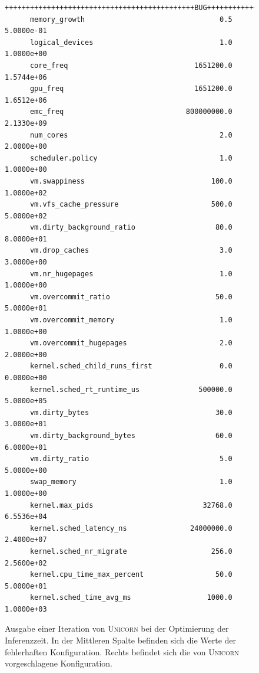 \documentclass[11pt]{article}
\begin{document}
\begin{figure}
  \centering
    \begin{Verbatim}[fontsize=\small,samepage=true]
      +++++++++++++++++++++++++++++++++++++++++++++BUG+++++++++++++++++++FIX
      memory_growth                                0.5            5.0000e-01
      logical_devices                              1.0            1.0000e+00
      core_freq                              1651200.0            1.5744e+06
      gpu_freq                               1651200.0            1.6512e+06
      emc_freq                             800000000.0            2.1330e+09
      num_cores                                    2.0            2.0000e+00
      scheduler.policy                             1.0            1.0000e+00
      vm.swappiness                              100.0            1.0000e+02
      vm.vfs_cache_pressure                      500.0            5.0000e+02
      vm.dirty_background_ratio                   80.0            8.0000e+01
      vm.drop_caches                               3.0            3.0000e+00
      vm.nr_hugepages                              1.0            1.0000e+00
      vm.overcommit_ratio                         50.0            5.0000e+01
      vm.overcommit_memory                         1.0            1.0000e+00
      vm.overcommit_hugepages                      2.0            2.0000e+00
      kernel.sched_child_runs_first                0.0            0.0000e+00
      kernel.sched_rt_runtime_us              500000.0            5.0000e+05
      vm.dirty_bytes                              30.0            3.0000e+01
      vm.dirty_background_bytes                   60.0            6.0000e+01
      vm.dirty_ratio                               5.0            5.0000e+00
      swap_memory                                  1.0            1.0000e+00
      kernel.max_pids                          32768.0            6.5536e+04
      kernel.sched_latency_ns               24000000.0            2.4000e+07
      kernel.sched_nr_migrate                    256.0            2.5600e+02
      kernel.cpu_time_max_percent                 50.0            5.0000e+01
      kernel.sched_time_avg_ms                  1000.0            1.0000e+03
    \end{Verbatim}
    \caption{Ausgabe einer Iteration von \textsc{Unicorn} bei der Optimierung der Inferenzzeit. In der Mittleren Spalte befinden sich die Werte der fehlerhaften Konfiguration. Rechts befindet sich die von \textsc{Unicorn} vorgeschlagene Konfiguration.}

    \label{fig:2}
\end{figure}
\end{document}
